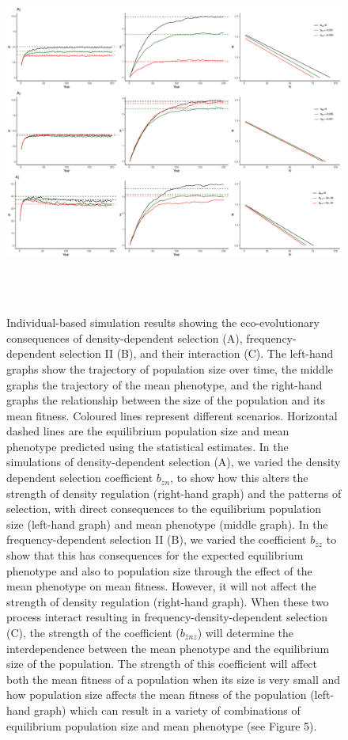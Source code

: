 \documentclass{article}
\begin{document}
\begin{figure}[h] 
	\centering
	\includegraphics[width=16cm, height=12cm]{Figures/Fig4.pdf}
	\caption{Individual-based simulation results showing the eco-evolutionary consequences of density-dependent selection (A), frequency-dependent selection II (B), and their interaction (C). The left-hand graphs show the trajectory of population size over time, the middle graphs the trajectory of the mean phenotype, and the right-hand graphs the relationship between the size of the population and its mean fitness. Coloured lines represent different scenarios. Horizontal dashed lines are the equilibrium population size and mean phenotype predicted using the statistical estimates. In the simulations of density-dependent selection (A), we varied the density dependent selection coefficient $b_{zn}$, to show how this alters the strength of density regulation (right-hand graph) and the patterns of selection, with direct consequences to the equilibrium population size (left-hand graph) and mean phenotype (middle graph). In the frequency-dependent selection II  (B), we varied the coefficient $b_{\bar{z}z}$ to show that this has consequences for the expected equilibrium phenotype and also to population size through the effect of the mean phenotype on mean fitness. However, it will not affect the strength of density regulation (right-hand graph). When these two process interact resulting in frequency-density-dependent selection (C), the strength of the  coefficient ($b_{\bar{z}nz}$) will determine the interdependence between the mean phenotype and the equilibrium size of the population. The strength of this coefficient will affect both the mean fitness of a population when its size is very small and how population size affects the mean fitness of the population (left-hand graph) which can result in a variety of combinations of equilibrium population size and mean phenotype (see Figure 5).} 
	\label{fig:sim3}
\end{figure}
\end{document}
